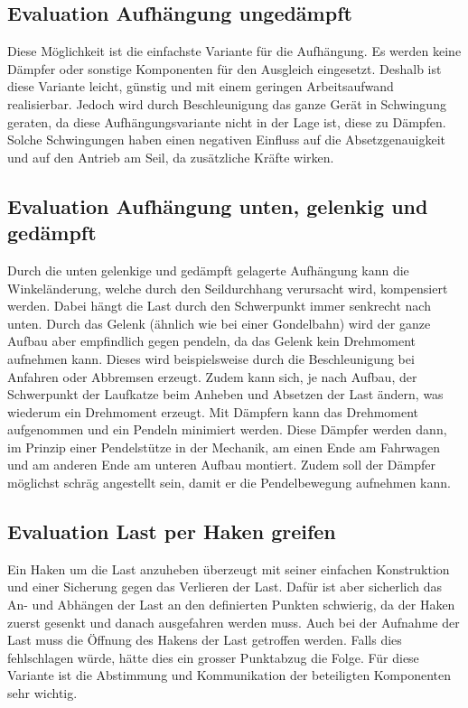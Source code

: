 \documentclass[a4paper]{report}
\begin{document}
\subsection{Evaluation Aufhängung ungedämpft}
\label{app:ssec:EvalAufhangUngedaempft}
Diese Möglichkeit ist die einfachste Variante für die Aufhängung. Es werden keine Dämpfer oder sonstige Komponenten für den Ausgleich eingesetzt. Deshalb ist diese Variante leicht, günstig und mit einem geringen Arbeitsaufwand realisierbar. Jedoch wird durch Beschleunigung das ganze Gerät in Schwingung geraten, da diese Aufhängungsvariante nicht in der Lage ist, diese zu Dämpfen. Solche Schwingungen haben einen negativen Einfluss auf die Absetzgenauigkeit und auf den Antrieb am Seil, da zusätzliche Kräfte wirken.

\subsection{Evaluation Aufhängung unten, gelenkig und gedämpft}
\label{app:ssec:EvalAufhangUnten}
Durch die unten gelenkige und gedämpft gelagerte Aufhängung kann die Winkeländerung, welche durch den Seildurchhang verursacht wird, kompensiert werden. Dabei hängt die Last durch den Schwerpunkt immer senkrecht nach unten. Durch das Gelenk (ähnlich wie bei einer Gondelbahn) wird der ganze Aufbau aber empfindlich gegen pendeln, da das Gelenk kein Drehmoment aufnehmen kann. Dieses wird beispielsweise durch die Beschleunigung bei Anfahren oder Abbremsen erzeugt. Zudem kann sich, je nach Aufbau, der Schwerpunkt der Laufkatze beim Anheben und Absetzen der Last ändern, was wiederum ein Drehmoment erzeugt. Mit Dämpfern kann das Drehmoment aufgenommen und ein Pendeln minimiert werden. Diese Dämpfer werden dann, im Prinzip einer Pendelstütze in der Mechanik, am einen Ende am Fahrwagen und am anderen Ende am unteren Aufbau montiert. Zudem soll der Dämpfer möglichst schräg angestellt sein, damit er die Pendelbewegung aufnehmen kann.

\subsection{Evaluation Last per Haken greifen}
\label{app:ssec:EvalLastHaken}
Ein Haken um die Last anzuheben überzeugt mit seiner einfachen Konstruktion und einer Sicherung gegen das Verlieren der Last. Dafür ist aber sicherlich das An- und Abhängen der Last an den definierten Punkten schwierig, da der Haken zuerst gesenkt und danach ausgefahren werden muss. Auch bei der Aufnahme der Last muss die Öffnung des Hakens der Last getroffen werden. Falls dies fehlschlagen würde, hätte dies ein grosser Punktabzug die Folge. Für diese Variante ist die Abstimmung und Kommunikation der beteiligten Komponenten sehr wichtig.
\end{document}
